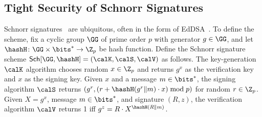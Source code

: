 

\subsection{Tight Security  of Schnorr Signatures}


 
  Schnorr signatures~\cite{C:Schnorr89} are ubiquitous, often in the form of EdDSA~\cite{eddsa}. %
 To define the scheme, fix a cyclic group $\GG$  of prime order $p$ with generator $g \in \GG$, and let $\hashH \colon \GG \times \bits^* \to \Z_p$ be hash function. Define the Schnorr signature scheme $\mathsf{Sch}[\GG,\hashH] = (\calK,\calS,\calV)$ as follows.  The key-generation $\calK$ algorithm   chooses random $x\in \Z_p$ and returns $g^x$ as the verification key and $x$ as the signing key.  Given $x$ and a message $m\in\bits^*$, the signing algorithm $\calS$ returns $(g^r,(r+\hashH(g^r \| m) \cdot x) \bmod p)$ for random $r\in \Z_p$.  Given $X = g^x$,  message $m\in\bits^*$, and  signature $(R,z)$, the verification algorithm $\calV$ returns 1 iff  $g^z = R \cdot X^{\hashH(R \| m)}$. 


 
